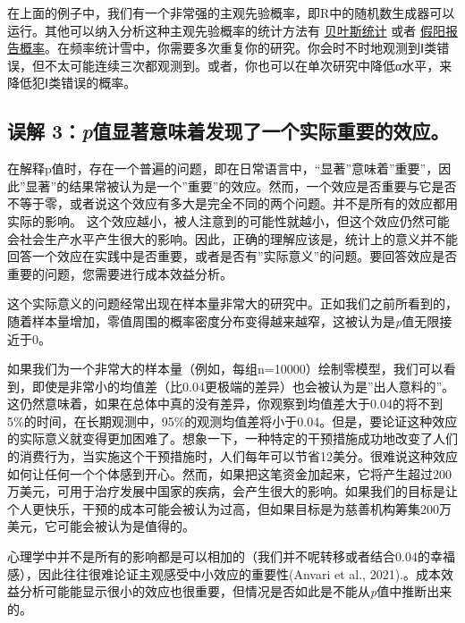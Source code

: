 \documentclass[
  letterpaper,
  DIV=11,
  numbers=noendperiod]{scrreprt}
\begin{document}
在上面的例子中，我们有一个非常强的主观先验概率，即R中的随机数生成器可以运行。其他可以纳入分析这种主观先验概率的统计方法有
\protect\hyperlink{bayes}{贝叶斯统计} 或者
\protect\hyperlink{ppv}{假阳报告概率}。在频率统计雪中，你需要多次重复你的研究。你会时不时地观测到Ⅰ类错误，但不太可能连续三次都观测到。或者，你也可以在单次研究中降低α水平，来降低犯Ⅰ类错误的概率。

\hypertarget{ux8befux89e3-3pux503cux663eux8457ux610fux5473ux7740ux53d1ux73b0ux4e86ux4e00ux4e2aux5b9eux9645ux91cdux8981ux7684ux6548ux5e94}{%
\subsection{\texorpdfstring{误解
3：\emph{p}值显著意味着发现了一个实际重要的效应。}{误解 3：p值显著意味着发现了一个实际重要的效应。}}\label{ux8befux89e3-3pux503cux663eux8457ux610fux5473ux7740ux53d1ux73b0ux4e86ux4e00ux4e2aux5b9eux9645ux91cdux8981ux7684ux6548ux5e94}}

在解释p值时，存在一个普遍的问题，即在日常语言中，``显著''意味着''重要''，因此''显著''的结果常被认为是一个''重要''的效应。然而，一个效应是否重要与它是否不等于零，或者说这个效应有多大是完全不同的两个问题。并不是所有的效应都用实际的影响。
这个效应越小，被人注意到的可能性就越小，但这个效应仍然可能会社会生产水平产生很大的影响。因此，正确的理解应该是，统计上的意义并不能回答一个效应在实践中是否重要，或者是否有''实际意义''的问题。要回答效应是否重要的问题，您需要进行成本效益分析。

这个实际意义的问题经常出现在样本量非常大的研究中。正如我们之前所看到的，随着样本量增加，零值周围的概率密度分布变得越来越窄，这被认为是\emph{p}值无限接近于0。

如果我们为一个非常大的样本量（例如，每组n=10000）绘制零模型，我们可以看到，即使是非常小的均值差（比0.04更极端的差异）也会被认为是''出人意料的''。这仍然意味着，如果在总体中真的没有差异，你观察到均值差大于0.04的将不到5\%的时间，在长期观测中，95\%的观测均值差将小于0.04。但是，要论证这种效应的实际意义就变得更加困难了。想象一下，一种特定的干预措施成功地改变了人们的消费行为，当实施这个干预措施时，人们每年可以节省12美分。很难说这种效应如何让任何一个个体感到开心。然而，如果把这笔资金加起来，它将产生超过200万美元，可用于治疗发展中国家的疾病，会产生很大的影响。如果我们的目标是让个人更快乐，干预的成本可能会被认为过高，但如果目标是为慈善机构筹集200万美元，它可能会被认为是值得的。

心理学中并不是所有的影响都是可以相加的（我们并不呢转移或者结合0.04的幸福感），因此往往很难论证主观感受中小效应的重要性(Anvari
et al.,
2021).。成本效益分析可能能显示很小的效应也很重要，但情况是否如此是不能从\emph{p}值中推断出来的。
\end{document}
